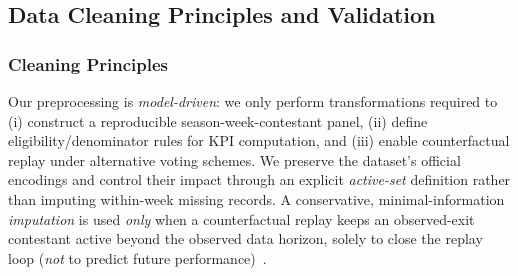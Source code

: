 
\subsection{Data Cleaning Principles and Validation}
\label{subsec:cleaning_principles_validation}

\subsubsection{Cleaning Principles}
\label{subsubsec:cleaning_principles}

Our preprocessing is \emph{model-driven}: we only perform transformations required to
(i) construct a reproducible season-week-contestant panel,
(ii) define eligibility/denominator rules for KPI computation, and
(iii) enable counterfactual replay under alternative voting schemes.
We preserve the dataset's official encodings and control their impact through an explicit
\emph{active-set} definition rather than imputing within-week missing records.
A conservative, minimal-information \emph{imputation} is used \emph{only} when a counterfactual replay keeps an observed-exit
contestant active beyond the observed data horizon, solely to close the replay loop
(\emph{not} to predict future performance)~\cite{comap2026_problemC_pdf}.

